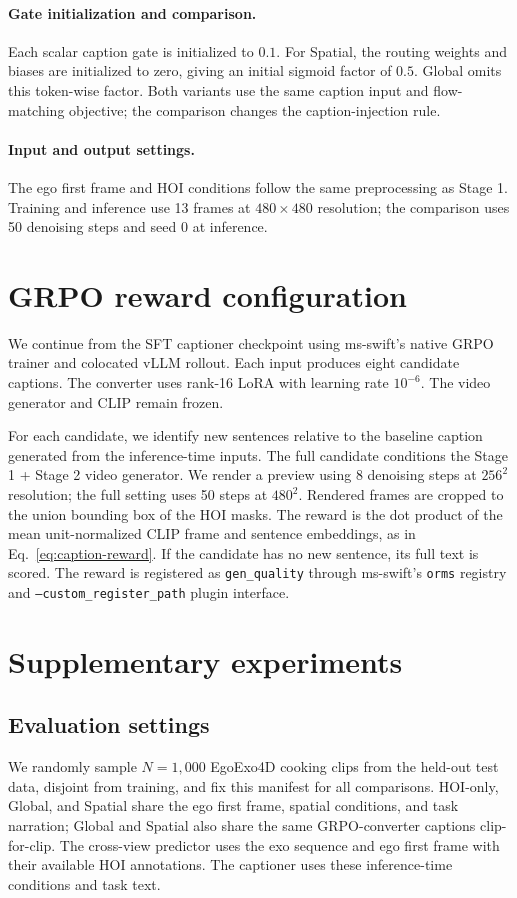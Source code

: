 \documentclass{article} %
\begin{document}
\paragraph{Gate initialization and comparison.}
Each scalar caption gate is initialized to $0.1$. For Spatial, the routing
weights and biases are initialized to zero, giving an initial sigmoid factor
of $0.5$. Global omits this token-wise factor. Both variants use the same
caption input and flow-matching objective; the comparison changes the
caption-injection rule.

\paragraph{Input and output settings.}
The ego first frame and HOI conditions follow the same preprocessing as
Stage 1. Training and inference use 13 frames at $480\times480$ resolution;
the comparison uses 50 denoising steps and seed $0$ at inference.

\section{GRPO reward configuration}
\label{app:status}
We continue from the SFT captioner checkpoint using ms-swift's native
GRPO trainer \citep{shao2024grpo} and colocated vLLM rollout.
Each input produces eight candidate captions. The converter uses rank-16
LoRA with learning rate $10^{-6}$. The video generator and CLIP remain frozen.

For each candidate, we identify new sentences relative to the baseline
caption generated from the inference-time inputs. The full candidate
conditions the Stage 1 + Stage 2 video generator. We render a preview using
8 denoising steps at $256^2$ resolution; the full setting uses 50 steps at
$480^2$. Rendered frames are cropped to the union bounding box of the HOI
masks. The reward is the dot product of the mean unit-normalized CLIP frame
and sentence embeddings, as in Eq.~\ref{eq:caption-reward}. If the candidate
has no new sentence, its full text is scored. The reward is registered as
\texttt{gen\_quality} through ms-swift's \texttt{orms} registry and
\texttt{--custom\_register\_path} plugin interface.

\section{Supplementary experiments}
\label{app:results-detail}
\subsection{Evaluation settings}
We randomly sample $N{=}1{,}000$ EgoExo4D cooking clips from the held-out
test data, disjoint from training, and fix this manifest for all comparisons.
HOI-only, Global, and Spatial share the ego first frame, spatial conditions,
and task narration; Global and Spatial also share the same GRPO-converter
captions clip-for-clip. The cross-view predictor uses the exo sequence and
ego first frame with their available HOI annotations. The captioner uses
these inference-time conditions and task text.
\end{document}
